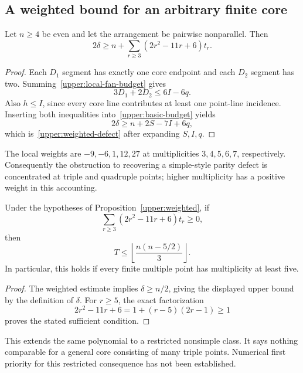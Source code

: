 \subsection{A weighted bound for an arbitrary finite core}

\begin{proposition}
\label{upper:weighted}
Let $n\ge4$ be even and let the arrangement be pairwise nonparallel. Then
\begin{equation}
 2\delta\ge n+\sum_{r\ge3}(2r^2-11r+6)t_r.
 \label{upper:weighted-defect}
\end{equation}
\end{proposition}

\begin{proof}
Each $D_1$ segment has exactly one core endpoint and each $D_2$ segment has two. Summing~\eqref{upper:local-fan-budget} gives
\[
 3D_1+2D_2\le6I-6q.
\]
Also $h\le I$, since every core line contributes at least one point-line incidence. Inserting both inequalities into~\eqref{upper:basic-budget} yields
\[
 2\delta\ge n+2S-7I+6q,
\]
which is~\eqref{upper:weighted-defect} after expanding $S,I,q$.
\end{proof}

The local weights are $-9,-6,1,12,27$ at multiplicities $3,4,5,6,7$, respectively. Consequently the obstruction to recovering a simple-style parity defect is concentrated at triple and quadruple points; higher multiplicity has a positive weight in this accounting.

\begin{corollary}
\label{upper:high-multiplicity}
Under the hypotheses of Proposition~\ref{upper:weighted}, if
\[
 \sum_{r\ge3}(2r^2-11r+6)t_r\ge0,
\]
then
\[
 T\le\left\lfloor\frac{n(n-5/2)}3\right\rfloor.
\]
In particular, this holds if every finite multiple point has multiplicity at least five.
\end{corollary}

\begin{proof}
The weighted estimate implies $\delta\ge n/2$, giving the displayed upper bound by the definition of $\delta$. For $r\ge5$, the exact factorization
\[
 2r^2-11r+6=1+(r-5)(2r-1)\ge1
\]
proves the stated sufficient condition.
\end{proof}

This extends the same polynomial to a restricted nonsimple class. It says nothing comparable for a general core consisting of many triple points. Numerical first priority for this restricted consequence has not been established.

